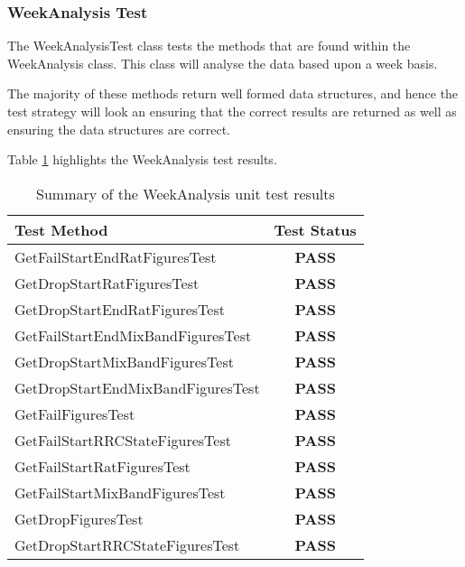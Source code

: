 \subsubsection{WeekAnalysis Test}

The {\ttfamily WeekAnalysisTest} class tests the methods that are found within 
the WeekAnalysis class. This class will analyse the data based upon a week 
basis.

The majority of these methods return well formed data structures, and hence the 
test strategy will look an ensuring that the correct results are returned as 
well as ensuring the data structures are correct.

Table \ref{tab:week_analysis_test} highlights the WeekAnalysis test results.

\begin{table}[h]
  \centering
  \begin{tabular}{|l|c|}
    \hline
    {\bfseries Test Method}           & {\bfseries Test Status} \\ 
    \hline
    GetFailStartEndRatFiguresTest     & {\bfseries \color{OliveGreen} PASS} \\ 
    GetDropStartRatFiguresTest        & {\bfseries \color{OliveGreen} PASS} \\ 
    GetDropStartEndRatFiguresTest     & {\bfseries \color{OliveGreen} PASS} \\ 
    GetFailStartEndMixBandFiguresTest & {\bfseries \color{OliveGreen} PASS} \\ 
    GetDropStartMixBandFiguresTest    & {\bfseries \color{OliveGreen} PASS} \\ 
    GetDropStartEndMixBandFiguresTest & {\bfseries \color{OliveGreen} PASS} \\ 
    GetFailFiguresTest                & {\bfseries \color{OliveGreen} PASS} \\ 
    GetFailStartRRCStateFiguresTest   & {\bfseries \color{OliveGreen} PASS} \\ 
    GetFailStartRatFiguresTest        & {\bfseries \color{OliveGreen} PASS} \\ 
    GetFailStartMixBandFiguresTest    & {\bfseries \color{OliveGreen} PASS} \\ 
    GetDropFiguresTest                & {\bfseries \color{OliveGreen} PASS} \\ 
    GetDropStartRRCStateFiguresTest   & {\bfseries \color{OliveGreen} PASS} \\
    \hline
  \end{tabular}
  \caption[Summary of the WeekAnalysis unit test results]
          {Summary of the WeekAnalysis unit test results}
  \label{tab:week_analysis_test}
\end{table}


